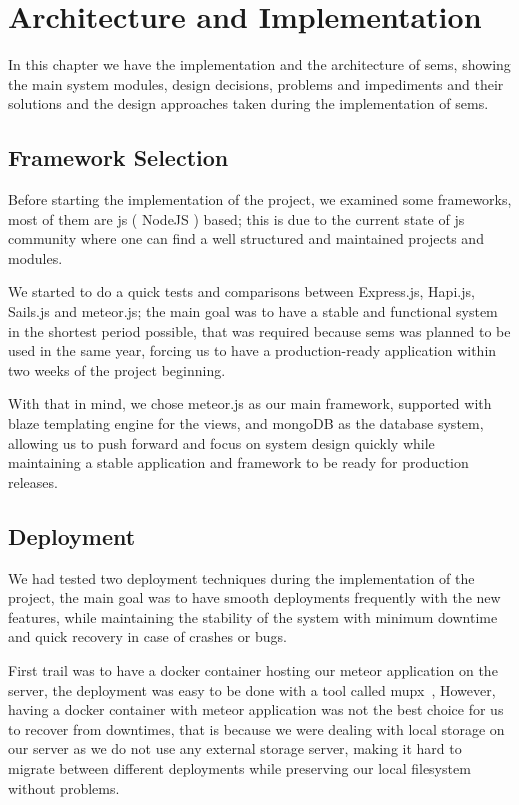 \chapter{Architecture and Implementation}
\label{chap:architecture_and_implementation}

In this chapter we have the implementation and the architecture of \ac{sems}, showing the main system modules, design decisions,
problems and impediments and their solutions and the design approaches taken during the implementation of \ac{sems}.

\section{Framework Selection}
\label{sec:framework_selection}
Before starting the implementation of the project, we examined some frameworks, most of them are \ac{js} ( NodeJS ) based;
this is due to the current state of \ac{js} community where one can find a well structured and maintained projects and modules.

\newParagraph
We started to do a quick tests and comparisons between Express.js, Hapi.js, Sails.js and meteor.js; the main goal was to have a stable
and functional system in the shortest period possible, that was required because \ac{sems} was planned to be used in the same year, forcing
us to have a production-ready application within two weeks of the project beginning.

\newParagraph
With that in mind, we chose meteor.js as our main framework, supported with blaze templating engine for the views, and mongoDB as the
database system, allowing us to push forward and focus on system design quickly while maintaining a stable application and framework
to be ready for production releases.

\section{Deployment}
\label{sec:deployment}
We had tested two deployment techniques during the implementation of the project, the main goal was to have smooth deployments frequently with
the new features, while maintaining the stability of the system with minimum downtime and quick recovery in case of crashes or bugs.

\newParagraph
First trail was to have a docker container hosting our meteor application on the server, the deployment was easy to be done with a tool
called mupx~\cite{mupx}, However, having a docker container with meteor application was not the best choice for us to recover from downtimes,
that is because we were dealing with local storage on our server as we do not use any external storage server, making it hard to migrate between
different deployments while preserving our local filesystem without problems.


